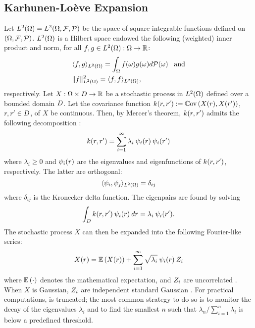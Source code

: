 \subsection{Karhunen-Lo\`{e}ve Expansion} 
Let ${L^{2}(\Omega)} = L^{2}(\Omega, \mathcal{F}, \mathcal{P})$ be the space of square-integrable functions defined on $(\Omega, \mathcal{F}, \mathcal{P})$. ${L^{2}(\Omega)}$ is a Hilbert space endowed the following (weighted) inner product and norm, for all $f, g \in {L^{2}(\Omega)}: \Omega \to \mathbb{R}$:
\begin{align*}
  & \langle f, g \rangle_{L^{2}(\Omega)} = \int_{\Omega} f(\omega) g(\omega) d\mathcal{P}(\omega) \;\;\; \text{and} \\
  & \| f \|^2_{L^{2}(\Omega)} = \langle f, f \rangle_{L^{2}(\Omega)},
\end{align*}
respectively. Let $X: \Omega \times D \to \mathbb{R}$ be a stochastic process in ${L^{2}(\Omega)}$ defined over a bounded domain $D$. Let the covariance function $\fCov{\r, \r'} := \Cov{X(\r), X(\r')}$, $r, r' \in D$, of $X$ be continuous. Then, by Mercer's theorem, $\fCov{\r, \r'}$ admits the following decomposition \cite{maitre2010}:
\[
  \fCov{\r, \r'} = \sum_{i = 1}^\infty \lambda_i \: \klb_i(\r) \: \klb_i(\r')
\]
where $\lambda_i \geq 0$ and $\psi_i(r)$ are the eigenvalues and eigenfunctions of $\fCov{\r, \r'}$, respectively. The latter are orthogonal:
\[
  \langle \psi_i, \psi_j \rangle_{L^{2}(\Omega)} = \delta_{ij}
\]
where $\delta_{ij}$ is the Kronecker delta function. The eigenpairs are found by solving
\begin{equation} \elabel{kl-eigenpairs}
  \int_\domain \fCov{\r, \r'} \: \klb_i (\r) \: \d\r = \lambda_i \: \klb_i(\r').
\end{equation}
The stochastic process $X$ can then be expanded into the following Fourier-like series:
\begin{equation} \elabel{kl-expansion}
  X(\r) = \E{X(\r)} + \sum_{i = 1}^\infty \sqrt{\lambda_i} \: \klb_i(\r) \: \Z_i
\end{equation}
where $\mathbb{E}\left( \cdot \right)$ denotes the mathematical expectation, and $Z_i$ are uncorrelated \rvs. When $X$ is Gaussian, $Z_i$ are independent standard Gaussian \rvs. For practical computations,  is truncated; the most common strategy to do so is to monitor the decay of the eigenvalues $\lambda_i$ and to find the smallest $n$ such that $\lambda_n / \sum_{i = 1}^n \lambda_i$ is below a predefined threshold.

